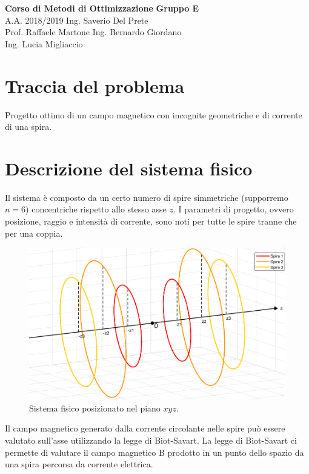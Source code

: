 \documentclass[a4paper, 11pt]{article}
\begin{document}
\noindent
\large\textbf{Corso di Metodi di Ottimizzazione} \hfill \textbf{Gruppo E} \\
\normalsize A.A. 2018/2019 \hfill Ing. Saverio Del Prete \\
Prof. Raffaele Martone \hfill Ing. Bernardo Giordano \\
\hphantom{}\hfill Ing. Lucia Migliaccio

\section*{Traccia del problema}

Progetto ottimo di un campo magnetico con incognite geometriche e di corrente di
una spira.

\section*{Descrizione del sistema fisico}

Il sistema è composto da un certo numero di spire simmetriche (supporremo $n=6$)
concentriche rispetto allo stesso asse $z$. I parametri di progetto, ovvero
posizione, raggio e intensità di corrente, sono noti per tutte le spire tranne
che per una coppia.

\begin{figure}[H]
	\centering
	\includegraphics[width=12cm]{assets/figure4}
	\caption{Sistema fisico posizionato nel piano $xyz$.}
\end{figure}

\noindent
Il campo magnetico generato dalla corrente circolante nelle spire può essere
valutato sull’asse utilizzando la legge di Biot-Savart. La legge di Biot-Savart
ci permette di valutare il campo magnetico B prodotto in un punto dello spazio
da una spira percorsa da corrente elettrica.
\end{document}
